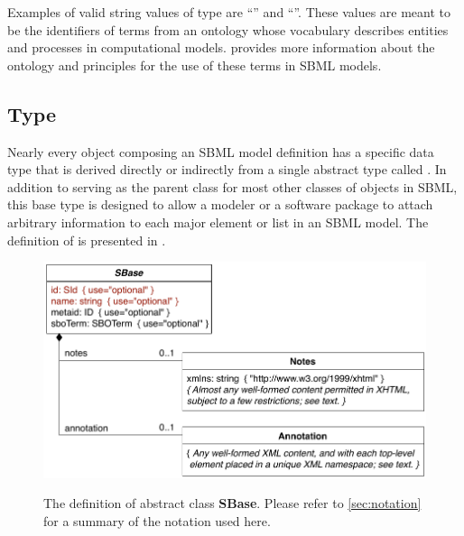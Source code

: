 Examples of valid string values of type  are
``'' and ``''.  These values
are meant to be the identifiers of terms from an ontology whose
vocabulary describes entities and processes in computational
models.   provides more information about
the ontology and principles for the use of these terms in SBML
models.


\subsection{Type }
\label{sec:sbase}

Nearly every object composing an SBML \thisL model definition has
a specific data type that is derived directly or indirectly from a
single abstract type called \SBase.  In addition to serving as the
parent class for most other classes of objects in SBML, this base
type is designed to allow a modeler or a software package to
attach arbitrary information to each major element or list in an
SBML model.  The definition of \SBase is presented in
.

\begin{figure}[hbt]
  \vspace*{-0.5ex}
  \centering
  \small
             {\includegraphics[scale=0.8]{figs/sbase-uml}}
  \caption{The definition of abstract class \textup{\textbf{\textsf{SBase}}}.  Please refer
    to \ref{sec:notation} for a summary of the
    notation used here.}
  \label{fig:sbase}
\end{figure}

